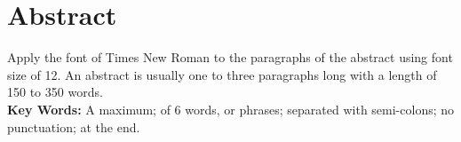 \chapter*{Abstract}
Apply the font of Times New Roman to the paragraphs of the abstract using font size of 12. An abstract is usually one to three paragraphs long with a length of 150 to 350 words.\\

\noindent
{\fontsize{11}{13.2}\selectfont \textbf{Key Words:} A maximum; of 6 words, or phrases; separated with semi-colons; no punctuation; at the end.}